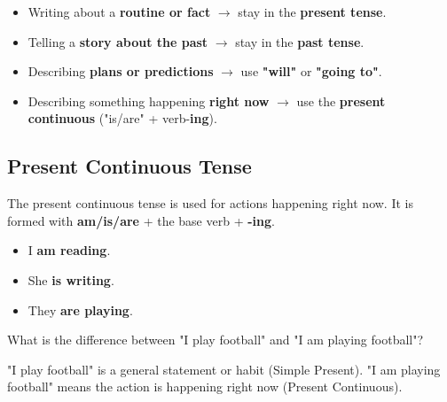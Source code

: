 \begin{itemize}
    \item Writing about a \textbf{routine or fact} \(\rightarrow\) stay in the \textbf{present tense}.
    \item Telling a \textbf{story about the past} \(\rightarrow\) stay in the \textbf{past tense}.
    \item Describing \textbf{plans or predictions} \(\rightarrow\) use \textbf{"will"} or \textbf{"going to"}.
    \item Describing something happening \textbf{right now} \(\rightarrow\) use the \textbf{present continuous} ("is/are" + verb-\textbf{ing}).
\end{itemize}

\subsection*{Present Continuous Tense}
The present continuous tense is used for actions happening right now. It is formed with \textbf{am/is/are} + the base verb + \textbf{-ing}.

\begin{examplebox}
    \begin{itemize}
        \item I \textbf{am reading}.
        \item She \textbf{is writing}.
        \item They \textbf{are playing}.
    \end{itemize}
\end{examplebox}

\begin{thinkbox}
    What is the difference between "I play football" and "I am playing football"?
    
    "I play football" is a general statement or habit (Simple Present).
    "I am playing football" means the action is happening right now (Present Continuous).
\end{thinkbox}

